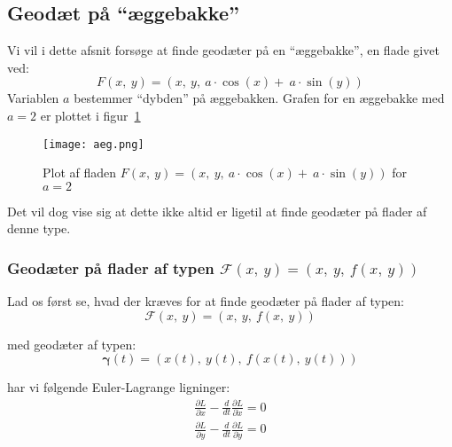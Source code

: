 \newcommand\ddiff[1]{\ddot{#1}}
\newcommand\diff[1]{\dot{#1}}

\subsection{ Geodæt på ``æggebakke'' }
Vi vil i dette afsnit forsøge at finde geodæter på en ``æggebakke'',
en flade givet ved:
\begin{equation}\label{eq:aeggebakke}
F(x,~y) = (x,~y,~a \cdot \cos(x)+~a \cdot \sin(y))
\end{equation}
Variablen \(a\) bestemmer ``dybden'' på æggebakken.
Grafen for en æggebakke med \(a = 2\) er plottet i figur~\ref{fig:aeg}
\begin{figure}[h!]
  \centering
    \texttt{[image: aeg.png]}
    \caption{Plot af fladen \(F(x,~y) = (x,~y,~a \cdot \cos(x)+~a \cdot \sin(y))\) for \(a=2\)}\label{fig:aeg}
\end{figure}
Det vil dog vise sig at dette ikke altid er ligetil at finde geodæter på flader af denne type.

\subsubsection{Geodæter på flader af typen \(\mathscr{F}(x,~y) = (x,~y,~f(x,~y))\)}
Lad os først se, hvad der kræves for at finde geodæter på flader af typen:
\begin{equation*}
\mathscr{F}(x,~y) = (x,~y,~f(x,~y))
\end{equation*}

med geodæter af typen:
\begin{equation} \label{eq:geodPlanFlade}
\pmb{\gamma}(t) = (x(t),~y(t),~f(x(t),~y(t)))
\end{equation}

har vi følgende Euler-Lagrange ligninger:
\begin{equation*}
\begin{gathered}
\frac{\partial L}{\partial x} - \frac{d}{dt}\frac{\partial L}{\partial \diff{x}} = 0\\
\frac{\partial L}{\partial y} - \frac{d}{dt}\frac{\partial L}{\partial \diff{y}} = 0
\end{gathered}
\end{equation*}

